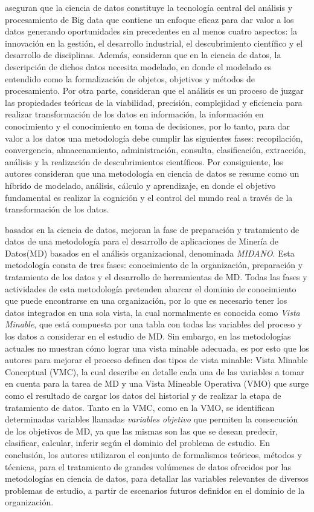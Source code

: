 \cite{Xu2021} aseguran que la ciencia de datos constituye la tecnología central del análisis y procesamiento de Big data que contiene un enfoque eficaz para dar valor a los datos generando oportunidades sin precedentes en al menos cuatro aspectos: la innovación en la gestión, el desarrollo industrial, el descubrimiento científico y el desarrollo de disciplinas. Además, consideran que en la ciencia de datos, la descripción de dichos datos necesita modelado, en donde el modelado es entendido como la formalización de objetos, objetivos y métodos de procesamiento. Por otra parte, consideran que el análisis es un proceso de juzgar las propiedades teóricas de la viabilidad, precisión, complejidad y eficiencia para realizar transformación de los datos en información, la información en conocimiento y  el conocimiento en toma de decisiones, por lo tanto, para dar valor a los datos una metodología debe cumplir las siguientes fases: recopilación, convergencia, almacenamiento, administración, consulta, clasificación, extracción, análisis  y la realización de descubrimientos científicos. Por consiguiente, los autores consideran que una metodología en ciencia de datos se resume como un híbrido de modelado, análisis, cálculo y aprendizaje, en donde el objetivo fundamental es realizar la cognición y el control del mundo real a través de la transformación de los datos.

\cite{Pacheco2014} basados en la ciencia de datos, mejoran la fase de preparación y tratamiento de datos de una metodología para el desarrollo de aplicaciones de Minería de Datos(MD) basados en el análisis organizacional, denominada \textit{MIDANO}. Esta metodología consta de tres fases: conocimiento de la organización,  preparación y tratamiento de los datos y el desarrollo de herramientas de MD. Todas las fases y actividades de esta metodología pretenden abarcar el dominio de conocimiento que puede encontrarse en una organización, por lo que es necesario tener los datos integrados en una sola vista, la cual normalmente es conocida como \textit{Vista Minable}, que está compuesta por una tabla con todas las variables del proceso y los datos a considerar en el estudio de MD. Sin embargo, en las metodologías actuales no muestran cómo lograr una vista minable adecuada, es por esto que los autores para mejorar el proceso definen dos tipos de vista minable: Vista Minable Conceptual (VMC), la cual describe en detalle cada una de las variables a tomar en cuenta para la tarea de MD  y una Vista Mineable Operativa (VMO) que surge como el resultado de cargar los datos del historial y de realizar la etapa de tratamiento de datos. Tanto en la VMC, como en la VMO, se identifican determinadas variables llamadas \textit{variables objetivo} que permiten la consecución de los objetivos de MD, ya que las mismas son las que se desean predecir, clasificar, calcular, inferir según el dominio del problema de estudio. En conclusión, los autores utilizaron el conjunto de formalismos teóricos, métodos y técnicas, para el tratamiento de grandes volúmenes de datos ofrecidos por las metodologías en ciencia de datos, para detallar las variables relevantes de diversos problemas de estudio, a partir de escenarios futuros definidos en el dominio de la organización.


